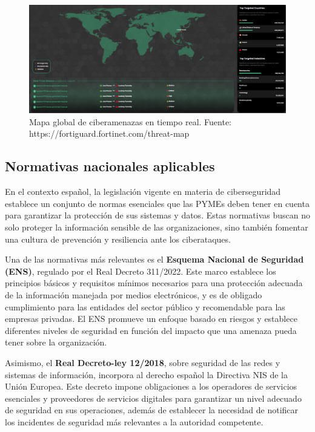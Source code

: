 \documentclass[a4paper, 10pt]{article}
\begin{document}
\begin{figure}[H]
    \centering
    \includegraphics[width=\textwidth]{images/mapa.png}
    \caption{Mapa global de ciberamenazas en tiempo real. Fuente: https://fortiguard.fortinet.com/threat-map}
    \label{fig:mapa-fortiguard}
\end{figure}


\subsection{Normativas nacionales aplicables}

En el contexto español, la legislación vigente en materia de ciberseguridad establece un conjunto de normas esenciales que las PYMEs deben tener en cuenta para garantizar la protección de sus sistemas y datos. Estas normativas buscan no solo proteger la información sensible de las organizaciones, sino también fomentar una cultura de prevención y resiliencia ante los ciberataques.
\par\vspace{0.5cm}

Una de las normativas más relevantes es el \textbf{Esquema Nacional de Seguridad (ENS)}, regulado por el Real Decreto 311/2022. Este marco establece los principios básicos y requisitos mínimos necesarios para una protección adecuada de la información manejada por medios electrónicos, y es de obligado cumplimiento para las entidades del sector público y recomendable para las empresas privadas. El ENS promueve un enfoque basado en riesgos y establece diferentes niveles de seguridad en función del impacto que una amenaza pueda tener sobre la organización. \cite{boe}
\par\vspace{0.5cm}

Asimismo, el \textbf{Real Decreto-ley 12/2018}, sobre seguridad de las redes y sistemas de información, incorpora al derecho español la Directiva NIS de la Unión Europea. Este decreto impone obligaciones a los operadores de servicios esenciales y proveedores de servicios digitales para garantizar un nivel adecuado de seguridad en sus operaciones, además de establecer la necesidad de notificar los incidentes de seguridad más relevantes a la autoridad competente. \cite{boe}
\par\vspace{0.5cm}
\end{document}

